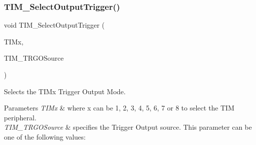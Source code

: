 \subsubsection{T\+I\+M\+\_\+\+Select\+Output\+Trigger()}
{\footnotesize\ttfamily void T\+I\+M\+\_\+\+Select\+Output\+Trigger (\begin{DoxyParamCaption}\item[{\textbf{ T\+I\+M\+\_\+\+Type\+Def} $\ast$}]{T\+I\+Mx,  }\item[{uint16\+\_\+t}]{T\+I\+M\+\_\+\+T\+R\+G\+O\+Source }\end{DoxyParamCaption})}



Selects the T\+I\+Mx Trigger Output Mode. 


\begin{DoxyParams}{Parameters}
{\em T\+I\+Mx} & where x can be 1, 2, 3, 4, 5, 6, 7 or 8 to select the T\+IM peripheral.\\
\hline
{\em T\+I\+M\+\_\+\+T\+R\+G\+O\+Source} & specifies the Trigger Output source. This parameter can be one of the following values\+:\\
\hline
\end{DoxyParams}

